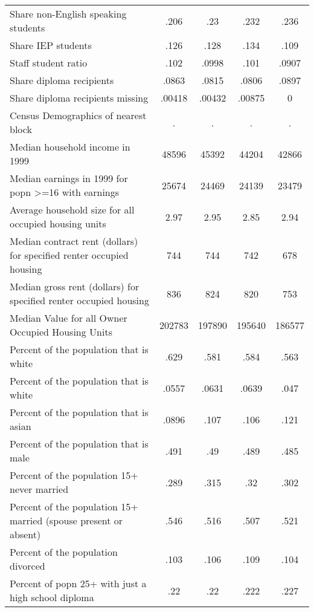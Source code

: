 {\begin{tabular}{l*{4}{c}}
Share non-English speaking students&        .206&         .23&        .232&        .236\\
Share IEP students  &        .126&        .128&        .134&        .109\\
Staff student ratio &        .102&       .0998&        .101&       .0907\\
Share diploma recipients&       .0863&       .0815&       .0806&       .0897\\
Share diploma recipients missing&      .00418&      .00432&      .00875&           0\\
Census Demographics of nearest block&           .&           .&           .&           .\\
Median household income in 1999&       48596&       45392&       44204&       42866\\
Median earnings in 1999 for popn >=16 with earnings&       25674&       24469&       24139&       23479\\
Average household size for all occupied housing units&        2.97&        2.95&        2.85&        2.94\\
Median contract rent (dollars) for specified renter occupied housing&         744&         744&         742&         678\\
Median gross rent (dollars) for specified renter occupied housing&         836&         824&         820&         753\\
Median Value for all Owner Occupied Housing Units&      202783&      197890&      195640&      186577\\
Percent of the population that is white&        .629&        .581&        .584&        .563\\
Percent of the population that is white&       .0557&       .0631&       .0639&        .047\\
Percent of the population that is asian&       .0896&        .107&        .106&        .121\\
Percent of the population that is male&        .491&         .49&        .489&        .485\\
Percent of the population 15+ never married&        .289&        .315&         .32&        .302\\
Percent of the population 15+ married (spouse present or absent)&        .546&        .516&        .507&        .521\\
Percent of the population divorced&        .103&        .106&        .109&        .104\\
Percent of popn 25+ with just a high school diploma&         .22&         .22&        .222&        .227\\

\end{tabular}}

